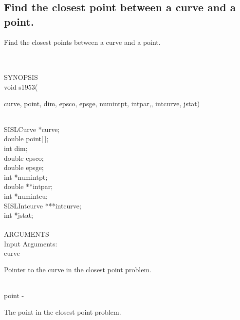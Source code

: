 \subsection{Find the closest point between a curve and a point.}
\begin{minipg1}
  Find the closest points between a curve and a point.
\end{minipg1} \\ \\
SYNOPSIS\\
        \>void s1953(\begin{minipg3}
        {\fov curve}, {\fov point}, {\fov dim}, {\fov epsco}, {\fov epsge}, {\fov numintpt},
        {\fov intpar},, {\fov intcurve}, {\fov jstat})
                \end{minipg3}\\[0.3ex]
                \>\>    SISLCurve       \>      *{\fov curve};\\
                \>\>    double  \>      {\fov point}[\,];\\
                \>\>    int     \>      {\fov dim};\\
                \>\>    double  \>      {\fov epsco};\\
                \>\>    double  \>      {\fov epsge};\\
                \>\>    int     \>      *{\fov numintpt};\\
                \>\>    double  \>      **{\fov intpar};\\
                \>\>    int     \>      *{\fov numintcu};\\
                \>\>    SISLIntcurve \> ***{\fov intcurve};\\
                \>\>    int     \>      *{\fov jstat};\\
\\
ARGUMENTS\\
        \>Input Arguments:\\
        \>\>    {\fov curve}    \> - \> \begin{minipg2}
                                Pointer to the curve in the closest point problem.
                                \end{minipg2}\\
        \>\>    {\fov point}    \> - \> \begin{minipg2}
                                The point in the closest point problem.
                                \end{minipg2}\\
